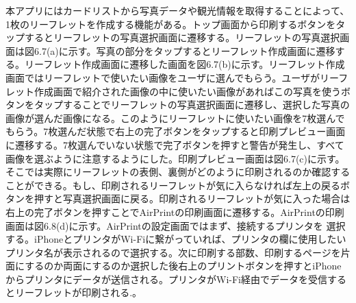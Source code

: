 本アプリにはカードリストから写真データや観光情報を取得することによって、1枚のリーフレットを作成する機能がある。トップ画面から印刷するボタンをタップするとリーフレットの写真選択画面に遷移する。リーフレットの写真選択画面は図6.7(a)に示す。写真の部分をタップするとリーフレット作成画面に遷移する。リーフレット作成画面に遷移した画面を図6.7(b)に示す。リーフレット作成画面ではリーフレットで使いたい画像をユーザに選んでもらう。ユーザがリーフレット作成画面で紹介された画像の中に使いたい画像があればこの写真を使うボタンをタップすることでリーフレットの写真選択画面に遷移し、選択した写真の画像が選んだ画像になる。このようにリーフレットに使いたい画像を7枚選んでもらう。7枚選んだ状態で右上の完了ボタンをタップすると印刷プレビュー画面に遷移する。7枚選んでいない状態で完了ボタンを押すと警告が発生し、すべて画像を選ぶように注意するようにした。印刷プレビュー画面は図6.7(c)に示す。そこでは実際にリーフレットの表側、裏側がどのように印刷されるのか確認することができる。もし、印刷されるリーフレットが気に入らなければ左上の戻るボタンを押すと写真選択画面に戻る。印刷されるリーフレットが気に入った場合は右上の完了ボタンを押すことでAirPrintの印刷画面に遷移する。AirPrintの印刷画面は図6.8(d)に示す。AirPrintの設定画面ではまず、接続するプリンタを 選択する。iPhoneとプリンタがWi-Fiに繋がっていれば、プリンタの欄に使用したいプリンタ名が表示されるので選択する。次に印刷する部数、印刷するページを片面にするのか両面にするのか選択した後右上のプリントボタンを押すとiPhoneからプリンタにデータが送信される。プリンタがWi-Fi経由でデータを受信するとリーフレットが印刷される.。
